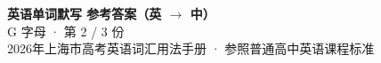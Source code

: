 \documentclass[10pt,a4paper]{article}
\begin{document}
\pagestyle{plain}

\begin{center}
{\LARGE\bfseries 英语单词默写 \quad 参考答案（英 $\to$ 中）}\\[0.22em]
{\large G 字母 · 第 2 / 3 份}\\[0.18em]
{\small 2026年上海市高考英语词汇用法手册 · 参照普通高中英语课程标准}
\end{center}

\vspace{0.2em}
\noindent{\color{rulegray}\rule{\textwidth}{0.8pt}}

\vspace{0.35em}

\vspace{0.25em}
\renewcommand{\arraystretch}{1.32}
\end{document}
